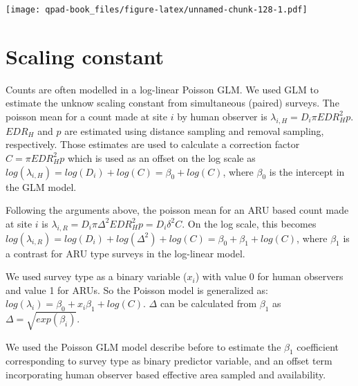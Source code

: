 \documentclass[12pt,]{book}
\begin{document}
\texttt{[image: qpad-book\_files/figure-latex/unnamed-chunk-128-1.pdf]}

\hypertarget{scaling-constant}{%
\section{Scaling constant}\label{scaling-constant}}

Counts are often modelled in a log-linear Poisson GLM. We used GLM to estimate
the unknow scaling constant from simultaneous (paired) surveys. The poisson mean
for a count made at site \(i\) by human observer is
\(\lambda_{i,H} = D_{i} \pi EDR_H^2 p\). \(EDR_H\) and \(p\) are estimated using distance
sampling and removal sampling, respectively. Those estimates are used to
calculate a correction factor \(C = \pi EDR_H^2 p\) which is used as an offset
on the log scale as \(log(\lambda_{i,H}) = log(D_{i}) + log(C) = \beta_0 + log(C)\),
where \(\beta_0\) is the intercept in the GLM model.

Following the arguments above, the poisson mean for an ARU based count
made at site \(i\) is \(\lambda_{i,R} = D_{i} \pi \Delta^2 EDR_H^2 p = D_{i} \delta^2 C\).
On the log scale, this becomes
\(log(\lambda_{i,R}) = log(D_{i}) + log(\Delta^2) + log(C) = \beta_0 + \beta_1 + log(C)\),
where \(\beta_1\) is a contrast for ARU type surveys in the log-linear model.

We used survey type as a binary variable (\(x_i\)) with value 0 for human observers
and value 1 for ARUs. So the Poisson model is generalized as:
\(log(\lambda_{i}) = \beta_0 + x_i \beta_1 + log(C)\). \(\Delta\) can be
calculated from \(\beta_1\) as \(\Delta = \sqrt{exp(\beta_i)}\).

We used the Poisson GLM model describe before to estimate the \(\beta_1\)
coefficient corresponding to survey type as binary predictor variable,
and an offset term incorporating human observer based effective area
sampled and availability.
\end{document}
